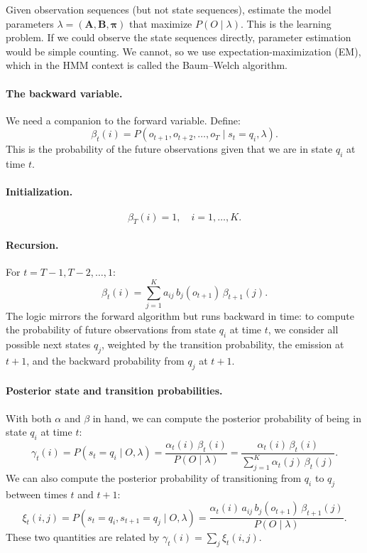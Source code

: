 Given observation sequences (but not state sequences), estimate the model parameters $\lambda = (\bm{A}, \bm{B}, \bm{\pi})$ that maximize $P(O \mid \lambda)$.
This is the learning problem.
If we could observe the state sequences directly, parameter estimation would be simple counting.
We cannot, so we use expectation-maximization (EM), which in the HMM context is called the Baum--Welch algorithm.

\paragraph{The backward variable.}
We need a companion to the forward variable.
Define:
\begin{equation}
\label{eq:backward-def}
  \beta_t(i) = P(o_{t+1}, o_{t+2}, \ldots, o_T \mid s_t = q_i, \lambda).
\end{equation}
This is the probability of the future observations given that we are in state $q_i$ at time $t$.

\paragraph{Initialization.}
\begin{equation}
\label{eq:backward-init}
  \beta_T(i) = 1, \quad i = 1, \ldots, K.
\end{equation}

\paragraph{Recursion.}
For $t = T-1, T-2, \ldots, 1$:
\begin{equation}
\label{eq:backward-recursion}
  \beta_t(i) = \sum_{j=1}^{K} a_{ij} \, b_j(o_{t+1}) \, \beta_{t+1}(j).
\end{equation}
The logic mirrors the forward algorithm but runs backward in time: to compute the probability of future observations from state $q_i$ at time $t$, we consider all possible next states $q_j$, weighted by the transition probability, the emission at $t+1$, and the backward probability from $q_j$ at $t+1$.

\paragraph{Posterior state and transition probabilities.}
With both $\alpha$ and $\beta$ in hand, we can compute the posterior probability of being in state $q_i$ at time $t$:
\begin{equation}
\label{eq:gamma}
  \gamma_t(i) = P(s_t = q_i \mid O, \lambda) = \frac{\alpha_t(i) \, \beta_t(i)}{P(O \mid \lambda)} = \frac{\alpha_t(i) \, \beta_t(i)}{\sum_{j=1}^{K} \alpha_t(j) \, \beta_t(j)}.
\end{equation}
We can also compute the posterior probability of transitioning from $q_i$ to $q_j$ between times $t$ and $t+1$:
\begin{equation}
\label{eq:xi}
  \xi_t(i, j) = P(s_t = q_i, s_{t+1} = q_j \mid O, \lambda) = \frac{\alpha_t(i) \, a_{ij} \, b_j(o_{t+1}) \, \beta_{t+1}(j)}{P(O \mid \lambda)}.
\end{equation}
These two quantities are related by $\gamma_t(i) = \sum_j \xi_t(i, j)$.

